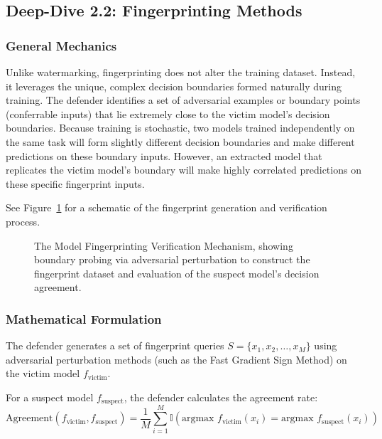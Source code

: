 \documentclass{article}
\begin{document}
\subsection{Deep-Dive 2.2: Fingerprinting Methods}

\subsubsection{General Mechanics}
Unlike watermarking, fingerprinting does not alter the training dataset. Instead, it leverages the unique, complex decision boundaries formed naturally during training. The defender identifies a set of adversarial examples or boundary points (conferrable inputs) that lie extremely close to the victim model's decision boundaries. 
Because training is stochastic, two models trained independently on the same task will form slightly different decision boundaries and make different predictions on these boundary inputs. However, an extracted model that replicates the victim model's boundary will make highly correlated predictions on these specific fingerprint inputs.

See Figure~\ref{fig:fingerprinting_mechanism} for a schematic of the fingerprint generation and verification process.

\begin{figure}[htbp]
    \centering
    \caption{The Model Fingerprinting Verification Mechanism, showing boundary probing via adversarial perturbation to construct the fingerprint dataset and evaluation of the suspect model's decision agreement.}
    \label{fig:fingerprinting_mechanism}
\end{figure}

\subsubsection{Mathematical Formulation}
The defender generates a set of fingerprint queries $S = \{x_1, x_2, \dots, x_M\}$ using adversarial perturbation methods (such as the Fast Gradient Sign Method) on the victim model $f_{\text{victim}}$.

For a suspect model $f_{\text{suspect}}$, the defender calculates the agreement rate:
\begin{equation}
    \text{Agreement}(f_{\text{victim}}, f_{\text{suspect}}) = \frac{1}{M} \sum_{i=1}^M \mathbb{I}\left( \text{argmax } f_{\text{victim}}(x_i) = \text{argmax } f_{\text{suspect}}(x_i) \right)
\end{equation}
\end{document}

